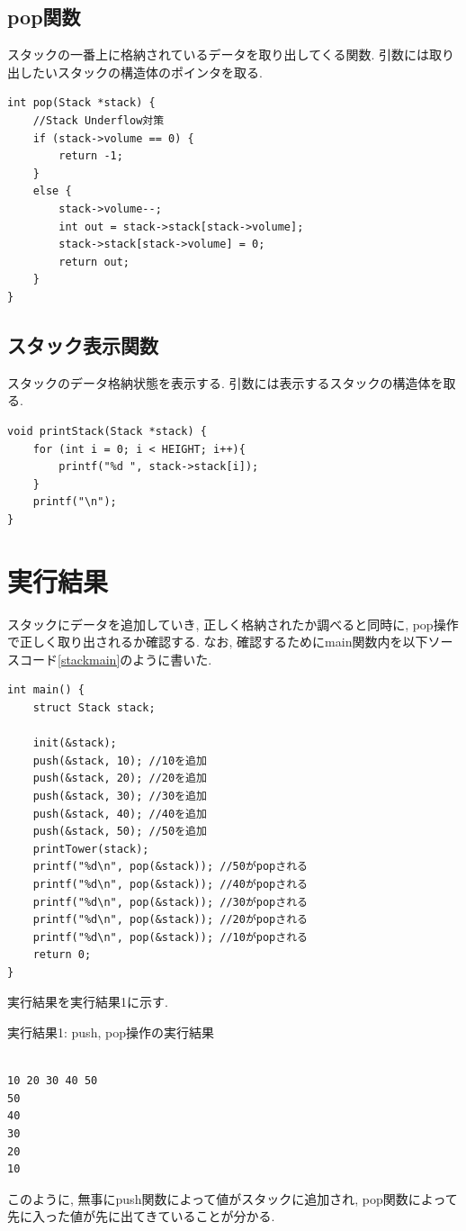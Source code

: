 \documentclass[a4j]{jsarticle}
\begin{document}
    \subsection{pop関数}
    スタックの一番上に格納されているデータを取り出してくる関数. 引数には取り出したいスタックの構造体のポインタを取る. 
    \begin{lstlisting}[label = pop, caption = pop関数]
int pop(Stack *stack) {
	//Stack Underflow対策
	if (stack->volume == 0) {
		return -1;
	}
	else {
		stack->volume--;
		int out = stack->stack[stack->volume];
		stack->stack[stack->volume] = 0;
		return out;
	}
}
    \end{lstlisting}
    \subsection{スタック表示関数}
    スタックのデータ格納状態を表示する. 引数には表示するスタックの構造体を取る. 　
    \begin{lstlisting}[label = printstack, caption = スタック表示関数]
void printStack(Stack *stack) {
	for (int i = 0; i < HEIGHT; i++){
		printf("%d ", stack->stack[i]);
	}
	printf("\n");
}
    \end{lstlisting}
    
    
    
\section{実行結果}
    スタックにデータを追加していき, 正しく格納されたか調べると同時に, pop操作で正しく取り出されるか確認する. 
    なお, 確認するためにmain関数内を以下ソースコード\ref{stackmain}のように書いた. 
    \begin{lstlisting}[label = stackmain, caption = スタックの動作確認のためのmain関数]
int main() {
	struct Stack stack;

	init(&stack);
	push(&stack, 10); //10を追加
	push(&stack, 20); //20を追加
	push(&stack, 30); //30を追加
	push(&stack, 40); //40を追加
	push(&stack, 50); //50を追加
	printTower(stack);
	printf("%d\n", pop(&stack)); //50がpopされる
	printf("%d\n", pop(&stack)); //40がpopされる
	printf("%d\n", pop(&stack)); //30がpopされる
	printf("%d\n", pop(&stack)); //20がpopされる
	printf("%d\n", pop(&stack)); //10がpopされる
	return 0;
}
    \end{lstlisting}

    実行結果を実行結果1に示す. 
    \begin{breakitembox}[l]{実行結果1: push, pop操作の実行結果}
    \begin{verbatim}

10 20 30 40 50
50
40
30
20
10
    \end{verbatim}
    \end{breakitembox}
このように, 無事にpush関数によって値がスタックに追加され, pop関数によって先に入った値が先に出てきていることが分かる. 
\end{document}
